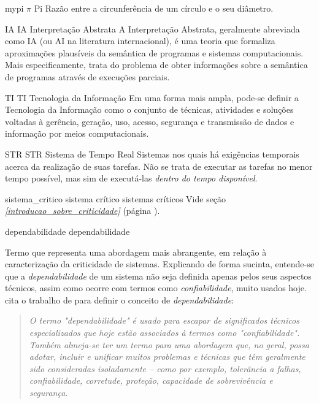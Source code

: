

\novosimbolo
    {mypi} %
    {\ensuremath{\pi}} %
    {Pi} %
    {Razão entre a circunferência de um círculo e o seu diâmetro.} %



\novoacronimo
    {IA} %
    {IA} %
    {{Interpretação Abstrata}} %
    {
        A Interpretação Abstrata, geralmente abreviada como IA (ou AI na 
        literatura internacional), é uma teoria que formaliza aproximações 
        plausíveis da semântica de programas e sistemas computacionais. Mais 
        especificamente, trata do problema de obter informações sobre a 
        semântica de programas através de execuções parciais.
    }

\novoacronimo
    {TI}
    {TI}
    {{Tecnologia da Informação}}
    {
        Em uma forma mais ampla, pode-se definir a Tecnologia da 
        Informação 
        como o conjunto de técnicas, atividades e soluções voltadas à 
        gerência, 
        geração, uso, acesso, segurança e transmissão de dados e 
        informação por 
        meios computacionais.
    }

\novoacronimo
    {STR}
    {STR}
    {{Sistema de Tempo Real}}
    {
        Sistemas nos quais há exigências temporais acerca da realização de suas 
        tarefas. Não se trata de executar as tarefas no menor tempo possível, 
        mas sim de executá-las \emph{dentro do tempo disponível}.
    }


\novadefinicaopl
    {sistema_critico}
    {sistema crítico}
    {sistemas críticos}
    {
        Vide seção \emph{\ref{introducao_sobre_criticidade}} (página 
        \pageref{introducao_sobre_criticidade}).
    }

\novadefinicao
    {dependabilidade}
    {dependabilidade}
    {
        Termo que representa uma abordagem mais abrangente, em relação à 
        caracterização da criticidade de sistemas. Explicando de forma sucinta, 
        entende-se que a \emph{dependabilidade} de um sistema não 
        seja definida apenas pelos seus aspectos técnicos, assim como 
        ocorre com termos como \emph{confiabilidade}, muito usados 
        hoje. \citeauthor{rushby_critical_1994} cita o trabalho de 
         para definir o conceito 
        de \emph{dependabilidade}:
        \blockquote{\textit{
            O termo \emph{"dependabilidade"} é usado para escapar de 
            significados técnicos especializados que hoje estão 
            associados à termos como \emph{"confiabilidade"}. Também almeja-se 
            ter um termo para uma abordagem que, no geral, possa adotar, 
            incluir e unificar muitos problemas e técnicas que têm geralmente 
            sido consideradas isoladamente -- como por exemplo, tolerância a 
            falhas, confiabilidade, corretude, proteção, capacidade de 
            sobrevivência e segurança.} \cite{rushby_critical_1994}
        }
    }

